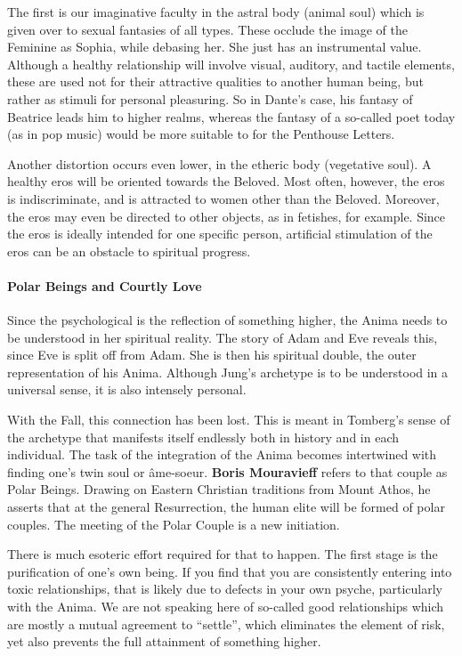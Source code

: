 The first is our imaginative faculty in the astral body (animal soul) which is given over to sexual fantasies of all types. These occlude the image of the Feminine as Sophia, while debasing her. She just has an instrumental value. Although a healthy relationship will involve visual, auditory, and tactile elements, these are used not for their attractive qualities to another human being, but rather as stimuli for personal pleasuring. So in Dante's case, his fantasy of Beatrice leads him to higher realms, whereas the fantasy of a so-called poet today (as in pop music) would be more suitable to for the Penthouse Letters.

Another distortion occurs even lower, in the etheric body (vegetative soul). A healthy eros will be oriented towards the Beloved. Most often, however, the eros is indiscriminate, and is attracted to women other than the Beloved. Moreover, the eros may even be directed to other objects, as in fetishes, for example. Since the eros is ideally intended for one specific person, artificial stimulation of the eros can be an obstacle to spiritual progress.

\paragraph{Polar Beings and Courtly Love}
Since the psychological is the reflection of something higher, the Anima needs to be understood in her spiritual reality. The story of Adam and Eve reveals this, since Eve is split off from Adam. She is then his spiritual double, the outer representation of his Anima. Although Jung's archetype is to be understood in a universal sense, it is also intensely personal.

With the Fall, this connection has been lost. This is meant in Tomberg's sense of the archetype that manifests itself endlessly both in history and in each individual. The task of the integration of the Anima becomes intertwined with finding one's twin soul or âme-soeur. \textbf{Boris Mouravieff} refers to that couple as Polar Beings. Drawing on Eastern Christian traditions from Mount Athos, he asserts that at the general Resurrection, the human elite will be formed of polar couples. The meeting of the Polar Couple is a new initiation.

There is much esoteric effort required for that to happen. The first stage is the purification of one's own being. If you find that you are consistently entering into toxic relationships, that is likely due to defects in your own psyche, particularly with the Anima. We are not speaking here of so-called good relationships which are mostly a mutual agreement to “settle”, which eliminates the element of risk, yet also prevents the full attainment of something higher.

